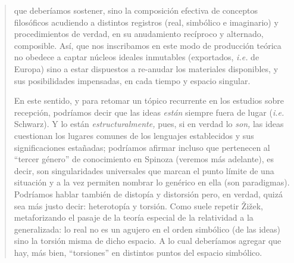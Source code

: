 \begin{quote}
que deberíamos sostener, sino la composición efectiva de conceptos filosóficos acudiendo a distintos registros (real, simbólico e imaginario) y procedimientos de verdad, en su anudamiento recíproco y alternado, composible. Así, que nos inscribamos en este modo de producción teórica no obedece a captar núcleos ideales inmutables (exportados, \emph{i.e.} de Europa) sino a estar dispuestos a re-anudar los materiales disponibles, y sus posibilidades impensadas, en cada tiempo y espacio singular.

En este sentido, y para retomar un tópico recurrente en los estudios sobre recepción, podríamos decir que las ideas \emph{están} siempre fuera de lugar (\emph{i.e.} Schwarz). Y lo están \emph{estructuralmente,} pues, si en verdad lo \emph{son,} las ideas cuestionan los lugares comunes de los lenguajes establecidos y sus significaciones estañadas; podríamos afirmar incluso que pertenecen al \enquote{tercer género} de conocimiento en Spinoza (veremos más adelante), es decir, son singularidades universales que marcan el punto límite de una situación y a la vez permiten nombrar lo genérico en ella (son paradigmas). Podríamos hablar también de distopía y distorsión pero, en verdad, quizá sea más justo decir: heterotopía y torsión. Como suele repetir Žižek, metaforizando el pasaje de la teoría especial de la relatividad a la generalizada: lo real no es un agujero en el orden simbólico (de las ideas) sino la torsión misma de dicho espacio. A lo cual deberíamos agregar que hay, más bien, \enquote{torsiones} en distintos puntos del espacio simbólico.


\end{quote}
